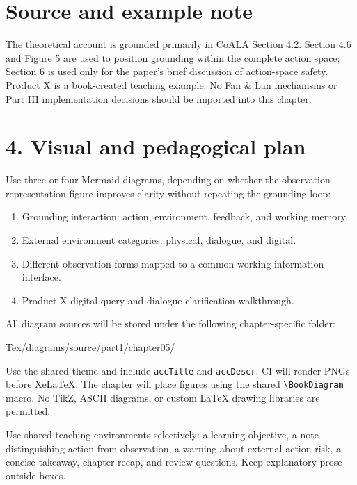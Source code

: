 \section*{Source and example note}
The theoretical account is grounded primarily in CoALA Section 4.2. Section 4.6 and Figure 5 are used to position grounding within the complete action space; Section 6 is used only for the paper's brief discussion of action-space safety. Product X is a book-created teaching example. No Fan \& Lan mechanisms or Part III implementation decisions should be imported into this chapter. 

\section*{4. Visual and pedagogical plan}
Use three or four Mermaid diagrams, depending on whether the observation-representation figure improves clarity without repeating the grounding loop:
\begin{enumerate}
  \item Grounding interaction: action, environment, feedback, and working memory.
  \item External environment categories: physical, dialogue, and digital.
  \item Different observation forms mapped to a common working-information interface.
  \item Product X digital query and dialogue clarification walkthrough.
\end{enumerate}

All diagram sources will be stored under the following chapter-specific folder:
\begin{center}\small\url{Tex/diagrams/source/part1/chapter05/}\end{center}
Use the shared theme and include \texttt{accTitle} and \texttt{accDescr}. CI will render PNGs before XeLaTeX. The chapter will place figures using the shared \verb|\BookDiagram| macro. No TikZ, ASCII diagrams, or custom LaTeX drawing libraries are permitted.

Use shared teaching environments selectively: a learning objective, a note distinguishing action from observation, a warning about external-action risk, a concise takeaway, chapter recap, and review questions. Keep explanatory prose outside boxes.

